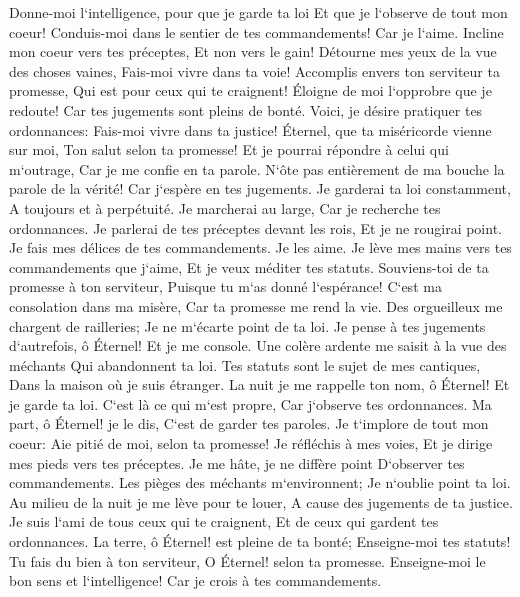\verse Donne-moi l`intelligence, pour que je garde ta loi Et que je l`observe de tout mon coeur! 
\verse Conduis-moi dans le sentier de tes commandements! Car je l`aime. 
\verse Incline mon coeur vers tes préceptes, Et non vers le gain! 
\verse Détourne mes yeux de la vue des choses vaines, Fais-moi vivre dans ta voie! 
\verse Accomplis envers ton serviteur ta promesse, Qui est pour ceux qui te craignent! 
\verse Éloigne de moi l`opprobre que je redoute! Car tes jugements sont pleins de bonté. 
\verse Voici, je désire pratiquer tes ordonnances: Fais-moi vivre dans ta justice! 
\verse Éternel, que ta miséricorde vienne sur moi, Ton salut selon ta promesse! 
\verse Et je pourrai répondre à celui qui m`outrage, Car je me confie en ta parole. 
\verse N`ôte pas entièrement de ma bouche la parole de la vérité! Car j`espère en tes jugements. 
\verse Je garderai ta loi constamment, A toujours et à perpétuité. 
\verse Je marcherai au large, Car je recherche tes ordonnances. 
\verse Je parlerai de tes préceptes devant les rois, Et je ne rougirai point. 
\verse Je fais mes délices de tes commandements. Je les aime. 
\verse Je lève mes mains vers tes commandements que j`aime, Et je veux méditer tes statuts. 
\verse Souviens-toi de ta promesse à ton serviteur, Puisque tu m`as donné l`espérance! 
\verse C`est ma consolation dans ma misère, Car ta promesse me rend la vie. 
\verse Des orgueilleux me chargent de railleries; Je ne m`écarte point de ta loi. 
\verse Je pense à tes jugements d`autrefois, ô Éternel! Et je me console. 
\verse Une colère ardente me saisit à la vue des méchants Qui abandonnent ta loi. 
\verse Tes statuts sont le sujet de mes cantiques, Dans la maison où je suis étranger. 
\verse La nuit je me rappelle ton nom, ô Éternel! Et je garde ta loi. 
\verse C`est là ce qui m`est propre, Car j`observe tes ordonnances. 
\verse Ma part, ô Éternel! je le dis, C`est de garder tes paroles. 
\verse Je t`implore de tout mon coeur: Aie pitié de moi, selon ta promesse! 
\verse Je réfléchis à mes voies, Et je dirige mes pieds vers tes préceptes. 
\verse Je me hâte, je ne diffère point D`observer tes commandements. 
\verse Les pièges des méchants m`environnent; Je n`oublie point ta loi. 
\verse Au milieu de la nuit je me lève pour te louer, A cause des jugements de ta justice. 
\verse Je suis l`ami de tous ceux qui te craignent, Et de ceux qui gardent tes ordonnances. 
\verse La terre, ô Éternel! est pleine de ta bonté; Enseigne-moi tes statuts! 
\verse Tu fais du bien à ton serviteur, O Éternel! selon ta promesse. 
\verse Enseigne-moi le bon sens et l`intelligence! Car je crois à tes commandements. 
